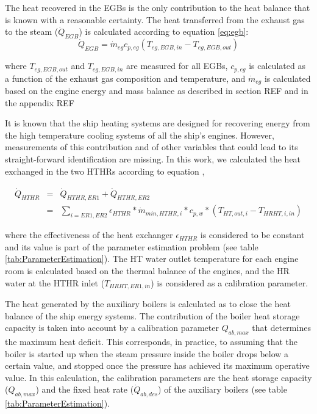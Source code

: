 \documentclass[preprint,12pt]{elsarticle}
\begin{document}
The heat recovered in the EGBs is the only contribution to the heat balance that is known with a reasonable certainty. The heat transferred from the exhaust gas to the steam ($\dot{Q}_{EGB}$) is calculated according to equation \ref{eq:egb}:
\begin{equation}
\dot{Q}_{EGB} = \dot{m}_{eg} c_{p,eg} (T_{eg,EGB,in} - T_{eg,EGB,out})
\end{equation}\label{eq:egb}

where $T_{eg,EGB,out}$ and $T_{eg,EGB,in}$ are measured for all EGBs, $c_{p,eg}$ is calculated as a function of the exhaust gas composition and temperature, and $ \dot{m}_{eg} $ is calculated based on the engine energy and mass balance as described in section REF and in the appendix REF

It is known that the ship heating systems are designed for recovering energy from the high temperature cooling systems of all the ship's engines. However, measurements of this contribution and of other variables that could lead to its straight-forward identification are missing. In this work, we calculated the heat exchanged in the two HTHRs according to equation \label{eqn:HTHR2},

\begin{eqnarray}
\dot{Q}_{HTHR} & = & \dot{Q}_{HTHR,ER1} + \dot{Q}_{HTHR,ER2} \label{eqn:HTHR1} \\
& = & \sum_{i=ER1,ER2}{\epsilon_{HTHR} * \dot{m}_{min,HTHR,i} * c_{p,w} * (T_{HT,out,i} - T_{HRHT,i,in})} \label{eqn:HTHR2}
\end{eqnarray}

where the effectiveness of the heat exchanger $\epsilon_{HTHR}$ is considered to be constant and its value is part of the parameter estimation problem (see table \ref{tab:ParameterEstimation}). The HT water outlet temperature for each engine room is calculated based on the thermal balance of the engines, and the HR water at the HTHR inlet ($T_{HRHT,ER1,in}$) is considered as a calibration parameter. 

The heat generated by the auxiliary boilers is calculated as to close the heat balance of the ship energy systems. The contribution of the boiler heat storage capacity is taken into account by a calibration parameter $Q_{ab,max}$ that determines the maximum heat deficit. This corresponds, in practice, to assuming that the boiler is started up when the steam pressure inside the boiler drops below a certain value, and stopped once the pressure has achieved its maximum operative value. In this calculation, the calibration parameters are the heat storage capacity ($Q_{ab,max}$) and the fixed heat rate ($\dot{Q}_{ab,des}$) of the auxiliary boilers (see table \ref{tab:ParameterEstimation}).
\end{document}
